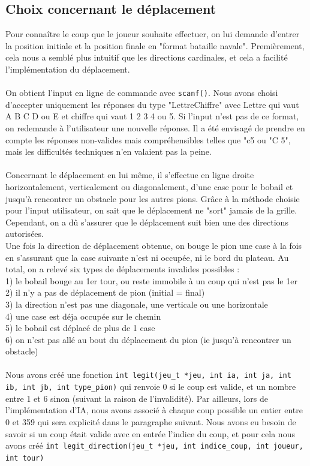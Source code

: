\documentclass{article}
\begin{document}
\subsection{Choix concernant le déplacement}

Pour connaître le coup que le joueur souhaite effectuer, on lui demande d'entrer la position initiale et la position finale en "format bataille navale". Premièrement, cela nous a semblé plus intuitif que les directions cardinales, et cela a facilité l'implémentation du déplacement.
\\ \\On obtient l'input en ligne de commande avec {\tt scanf()}. Nous avons choisi d'accepter uniquement les réponses du type "LettreChiffre" avec Lettre qui vaut A B C D ou E et chiffre qui vaut 1 2 3 4 ou 5. Si l'input n'est pas de ce format, on redemande à l'utilisateur une nouvelle réponse. Il a été envisagé de prendre en compte les réponses non-valides mais compréhensibles telles que "c5 ou "C 5", mais les difficultés techniques n'en valaient pas la peine.
\\ \\ Concernant le déplacement en lui même, il s'effectue en ligne droite horizontalement, verticalement ou diagonalement, d'une case pour le bobail et jusqu'à rencontrer un obstacle pour les autres pions. Grâce à la méthode choisie pour l'input utilisateur, on sait que le déplacement ne "sort" jamais de la grille. Cependant, on a dû s'assurer que le déplacement suit bien une des directions autorisées.
\\ Une fois la direction de déplacement obtenue, on bouge le pion une case à la fois en s'assurant que la case suivante n'est ni occupée, ni le bord du plateau. Au total, on a relevé six types de déplacements invalides possibles :
\\1) le bobail bouge au 1er tour, ou reste immobile à un coup qui n'est pas le 1er
\\2) il n'y a pas de déplacement de pion (initial = final)
\\3) la direction n'est pas une diagonale, une verticale ou une horizontale
\\4) une case est déja occupée sur le chemin
\\5) le bobail est déplacé de plus de 1 case
\\6) on n'est pas allé au bout du déplacement du pion (ie jusqu'à rencontrer un obstacle)
\\\\Nous avons créé une fonction {\tt int legit(jeu\_t *jeu, int ia, int ja, int ib, int jb, int type\_pion)} qui renvoie 0 si le  coup est valide, et un nombre entre 1 et 6 sinon (suivant la raison de l'invalidité). Par ailleurs, lors de l'implémentation d'IA, nous avons associé à chaque coup possible un entier entre 0 et 359 qui sera explicité dans le paragraphe suivant. Nous avons eu besoin de savoir si un coup était valide avec en entrée l'indice du coup, et pour cela nous avons créé {\tt int legit\_direction(jeu\_t *jeu, int indice\_coup, int joueur, int tour)}
\end{document}
